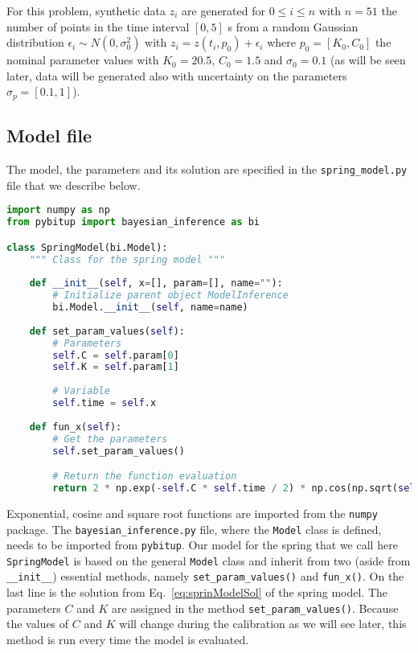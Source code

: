 \documentclass[a4paper,11pt]{article}
\begin{document}
For this problem, synthetic data $z_i$ are generated for $0 \le i \le n$ with $n=51$ the number of points in the time interval $[0, 5]$ s from a random Gaussian distribution $\epsilon_i \sim N(0, \sigma_0^2)$ with $z_i = z(t_i, p_0) + \epsilon_i$ where $p_0 = [K_0, C_0]$ the nominal parameter values with $K_0 = 20.5$, $C_0 = 1.5$ and $\sigma_0 = 0.1$ (as will be seen later, data will be generated also with uncertainty on the parameters $\sigma_p = [0.1, 1]$). 

\subsection{Model file} 

The model, the parameters and its solution are specified in the \texttt{spring\_model.py} file that we describe below. 


\begin{lstlisting}[language=Python, breaklines=true, tabsize=4, backgroundcolor=\color{codegray}]
import numpy as np
from pybitup import bayesian_inference as bi

class SpringModel(bi.Model): 
	""" Class for the spring model """	
	
	def __init__(self, x=[], param=[], name=""): 
		# Initialize parent object ModelInference
		bi.Model.__init__(self, name=name)	
	
	def set_param_values(self):
		# Parameters 
		self.C = self.param[0] 
		self.K = self.param[1]
		
		# Variable 
		self.time = self.x 
	
	def fun_x(self):
		# Get the parameters
		self.set_param_values() 

        # Return the function evaluation 		
		return 2 * np.exp(-self.C * self.time / 2) * np.cos(np.sqrt(self.K - self.C**2 / 4) * self.time)
\end{lstlisting}

Exponential, cosine and square root functions are imported from the \texttt{numpy} package. The \texttt{bayesian\_inference.py} file, where the \texttt{Model} class is defined, needs to be imported from \texttt{pybitup}. Our model for the spring that we call here \texttt{SpringModel} is based on the general \texttt{Model} class and inherit from two (aside from \texttt{\_\_init\_\_}) essential methods, namely \texttt{set\_param\_values()} and \texttt{fun\_x()}. On the last line is the solution from Eq.~\ref{eq:sprinModelSol} of the spring model. The parameters $C$ and $K$ are assigned in the method \texttt{set\_param\_values()}. Because the values of $C$ and $K$ will change during the calibration as we will see later, this method is run every time the model is evaluated. 
\end{document}
